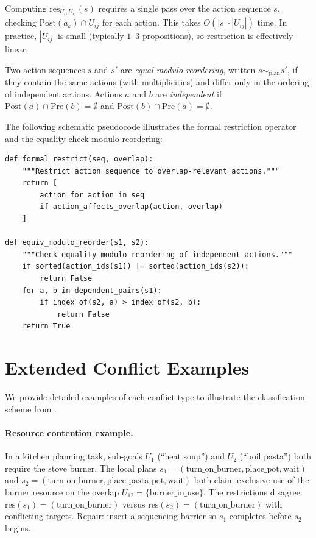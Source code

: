 \documentclass[11pt]{article}
\newcommand{\SubGoal}[1]{U_{#1}}
\newcommand{\PreCond}{\mathrm{Pre}}
\newcommand{\PostCond}{\mathrm{Post}}
\newcommand{\PlanRes}{\mathrm{res}}
\newcommand{\PlanEquiv}{\sim_{\mathrm{plan}}}
\begin{document}
\begin{remark}
  Computing $\PlanRes_{\SubGoal{i}, \SubGoal{ij}}(s)$ requires
  a single pass over the action sequence $s$, checking
  $\PostCond(a_k) \cap \SubGoal{ij}$ for each action.  This
  takes $O(|s| \cdot |\SubGoal{ij}|)$ time.  In practice,
  $|\SubGoal{ij}|$ is small (typically $1$--$3$ propositions),
  so restriction is effectively linear.
\end{remark}

\begin{definition}\label{def:eq-reorder}
  Two action sequences $s$ and $s'$ are \emph{equal modulo
  reordering}, written $s \PlanEquiv s'$, if they contain the
  same actions (with multiplicities) and differ only in the
  ordering of independent actions.  Actions $a$ and $b$ are
  \emph{independent} if $\PostCond(a) \cap \PreCond(b) = \emptyset$
  and $\PostCond(b) \cap \PreCond(a) = \emptyset$.
\end{definition}

The following schematic pseudocode illustrates the formal restriction
operator and the equality check modulo reordering:

\begin{lstlisting}
def formal_restrict(seq, overlap):
    """Restrict action sequence to overlap-relevant actions."""
    return [
        action for action in seq
        if action_affects_overlap(action, overlap)
    ]

def equiv_modulo_reorder(s1, s2):
    """Check equality modulo reordering of independent actions."""
    if sorted(action_ids(s1)) != sorted(action_ids(s2)):
        return False
    for a, b in dependent_pairs(s1):
        if index_of(s2, a) > index_of(s2, b):
            return False
    return True
\end{lstlisting}

\section{Extended Conflict Examples}\label{app:examples}

We provide detailed examples of each conflict type to illustrate
the classification scheme from .

\paragraph{Resource contention example.}
In a kitchen planning task, sub-goals $\SubGoal{1}$ (``heat soup'')
and $\SubGoal{2}$ (``boil pasta'') both require the stove burner.
The local plans $s_1 = (\text{turn\_on\_burner}, \text{place\_pot},
\text{wait})$ and $s_2 = (\text{turn\_on\_burner},
\text{place\_pasta\_pot}, \text{wait})$ both claim exclusive use
of the burner resource on the overlap $\SubGoal{12} =
\{\text{burner\_in\_use}\}$.  The restrictions disagree:
$\PlanRes(s_1) = (\text{turn\_on\_burner})$ versus
$\PlanRes(s_2) = (\text{turn\_on\_burner})$ with conflicting
targets.  Repair: insert a sequencing barrier so $s_1$ completes
before $s_2$ begins.
\end{document}

